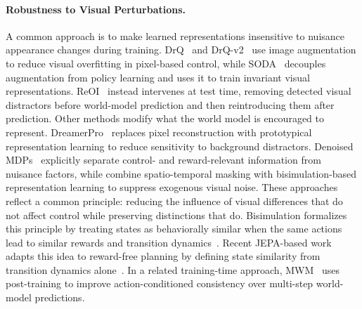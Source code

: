 \documentclass{article}
\begin{document}
\paragraph{Robustness to Visual Perturbations.}
A common approach is to make learned representations insensitive to nuisance
appearance changes during training. DrQ~\citep{kostrikov2020drq} and
DrQ-v2~\citep{yarats2022drqv2} use image augmentation to reduce visual
overfitting in pixel-based control, while SODA~\citep{hansen2021soda}
decouples augmentation from policy learning and uses it to train invariant
visual representations. ReOI~\citep{chen2025reoi} instead intervenes at test
time, removing detected visual distractors before world-model prediction and
then reintroducing them after prediction.
Other methods modify what the world model is encouraged to represent.
DreamerPro~\citep{deng2022dreamerpro} replaces pixel reconstruction with
prototypical representation learning to reduce sensitivity to background
distractors. Denoised MDPs~\citep{wang2022denoisedmdps} explicitly separate
control- and reward-relevant information from nuisance factors, while
\citet{sun2024latentrobustwm} combine spatio-temporal masking with
bisimulation-based representation learning to suppress exogenous visual noise.
These approaches reflect a common principle: reducing the influence of visual
differences that do not affect control while preserving distinctions that do.
Bisimulation formalizes this principle by treating states as behaviorally
similar when the same actions lead to similar rewards and transition
dynamics~\citep{gelada2019deepmdp,zhang2021dbc,bsmpc}. Recent JEPA-based work
adapts this idea to reward-free planning by defining state similarity from
transition dynamics alone~\citep{toso2026bisimjepa}.
In a related training-time approach, MWM~\citep{yan2026mwm} uses post-training to improve action-conditioned
consistency over multi-step world-model predictions.
\end{document}
